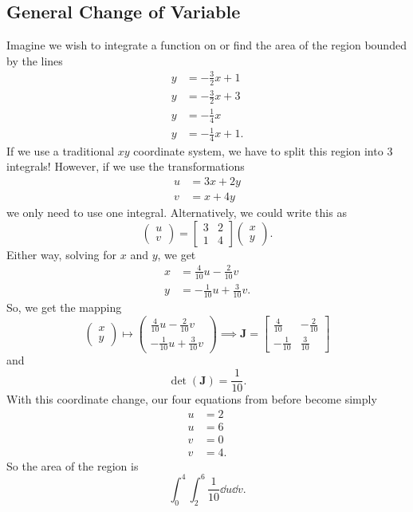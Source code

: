 \documentclass[12pt]{article}
\theoremstyle{plain} %
\theoremstyle{definition}
\theoremstyle{definition}
\theoremstyle{definition}
\theoremstyle{remark}
\begin{document}
\subsection{General Change of Variable}
Imagine we wish to integrate a function on or find the area of the region bounded by the lines
\begin{align*}
    y &= -\frac{3}{2}x+1 \\
    y &= -\frac{3}{2}x+3 \\
    y &= -\frac{1}{4}x   \\
    y &= -\frac{1}{4}x+1.
\end{align*}
If we use a traditional $xy$ coordinate system, we have to split this region into $3$ integrals! However, if we use the transformations
\begin{align*}
    u &= 3x+2y \\
    v &= x+4y
\end{align*}
we only need to use one integral. Alternatively, we could write this as
\[ \begin{pmatrix} u \\ v \end{pmatrix} = \begin{bmatrix} 3 & 2 \\ 1 & 4 \end{bmatrix} \begin{pmatrix} x \\ y \end{pmatrix}. \]
Either way, solving for $x$ and $y$, we get
\begin{align*}
    x &= \frac{4}{10}u - \frac{2}{10}v \\
    y &= -\frac{1}{10}u + \frac{3}{10}v.
\end{align*}
So, we get the mapping
\[ \begin{pmatrix} x \\ y \end{pmatrix} \mapsto \begin{pmatrix}\frac{4}{10}u - \frac{2}{10}v \\ -\frac{1}{10}u + \frac{3}{10}v \end{pmatrix} \implies \mathbf{J} =
\begin{bmatrix}
    \frac{4}{10} & -\frac{2}{10} \\
    -\frac{1}{10} & \frac{3}{10}
\end{bmatrix} \]
and
\[ \det(\mathbf{J}) = \frac{1}{10}. \]
With this coordinate change, our four equations from before become simply
\begin{align*}
    u &= 2 \\
    u &= 6 \\
    v &= 0 \\
    v &= 4.
\end{align*}
So the area of the region is
\[ \int_0^4 \int_2^6 \frac{1}{10} \dd{u} \dd{v}. \]
\end{document}
